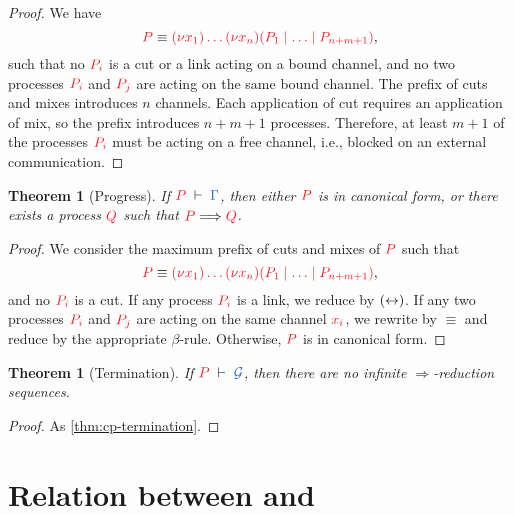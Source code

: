 \documentclass[submission,copyright,creativecommons]{eptcs}
\newtheorem{theorem}[lemma]{Theorem}
\begin{document}
\begin{proof}
  We have
  \[
  \tm{P} \equiv \tm{\piNew{x_1}{\dots\piNew{x_n}{(P_1 \ppar \dots \ppar P_{n+m+1})}}},
  \]
  such that no $\tm{P_i}$ is a cut or a link acting on a bound channel, and no two processes $\tm{P_i}$ and $\tm{P_j}$ are acting on the same bound channel. The prefix of cuts and mixes introduces $n$ channels. Each application of cut requires an application of mix, so the prefix introduces $n+m+1$ processes. Therefore, at least $m+1$ of the processes $\tm{P_i}$ must be acting on a free channel, i.e., blocked on an external communication.
\end{proof}
\begin{theorem}[Progress]\label{thm:hcp-progress}
  If $\seq[P]{\Gamma}$, then either $\tm{P}$ is in canonical form, or there exists a process $\tm{Q}$ such that $\tm{P}\Longrightarrow\tm{Q}$.
\end{theorem} 
\begin{proof}
  We consider the maximum prefix of cuts and mixes of $\tm{P}$ such that
  \[
  \tm{P} \equiv \tm{\piNew{x_1}{\dots\piNew{x_n}{(P_1 \ppar \dots \ppar P_{n+m+1})}}},
  \]
  and no $\tm{P_i}$ is a cut. If any process $\tm{P_i}$ is a link, we reduce by $({\leftrightarrow})$. If any two processes $\tm{P_i}$ and $\tm{P_j}$ are acting on the same channel $\tm{x_i}$, we rewrite by $\equiv$ and reduce by the appropriate $\beta$-rule. Otherwise, $\tm{P}$ is in canonical form.
\end{proof}
\begin{theorem}[Termination]\label{thm:hcp-termination}
  If $\seq[P]{\mathcal{G}}$, then there are no infinite $\Longrightarrow$-reduction sequences.
\end{theorem} 
\begin{proof}
  As \cref{thm:cp-termination}.
\end{proof}



\section{Relation between \cp and \hcp}
\label{sec:cp2hcp}
\end{document}
